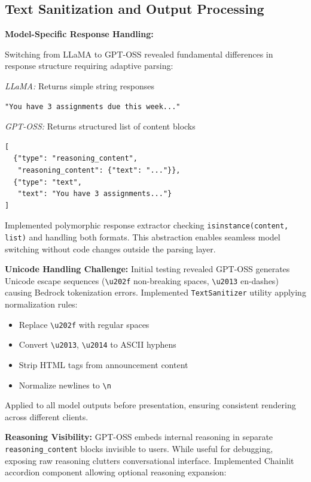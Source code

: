 \documentclass{article}
\begin{document}
\subsection{Text Sanitization and Output Processing}

\textbf{Model-Specific Response Handling:}

Switching from LLaMA to GPT-OSS revealed fundamental differences in response structure requiring adaptive parsing:

\textit{LLaMA:} Returns simple string responses
\begin{verbatim}
"You have 3 assignments due this week..."
\end{verbatim}

\textit{GPT-OSS:} Returns structured list of content blocks
\begin{verbatim}
[
  {"type": "reasoning_content", 
   "reasoning_content": {"text": "..."}},
  {"type": "text", 
   "text": "You have 3 assignments..."}
]
\end{verbatim}

Implemented polymorphic response extractor checking \texttt{isinstance(content, list)} and handling both formats. This abstraction enables seamless model switching without code changes outside the parsing layer.

\textbf{Unicode Handling Challenge:} Initial testing revealed GPT-OSS generates Unicode escape sequences (\texttt{\textbackslash u202f} non-breaking spaces, \texttt{\textbackslash u2013} en-dashes) causing Bedrock tokenization errors. Implemented \texttt{TextSanitizer} utility applying normalization rules:

\begin{itemize}
    \item Replace \texttt{\textbackslash u202f} with regular spaces
    \item Convert \texttt{\textbackslash u2013}, \texttt{\textbackslash u2014} to ASCII hyphens
    \item Strip HTML tags from announcement content
    \item Normalize newlines to \texttt{\textbackslash n}
\end{itemize}

Applied to all model outputs before presentation, ensuring consistent rendering across different clients.

\textbf{Reasoning Visibility:} GPT-OSS embeds internal reasoning in separate \texttt{reasoning\_content} blocks invisible to users. While useful for debugging, exposing raw reasoning clutters conversational interface. Implemented Chainlit accordion component allowing optional reasoning expansion:
\end{document}
